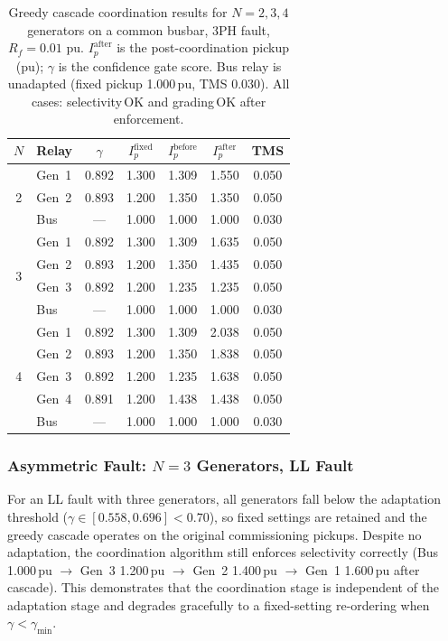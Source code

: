 \documentclass[12pt,a4paper]{article}
\theoremstyle{definition}
\theoremstyle{plain}
\newcommand{\pu}{\,\text{pu}}
\begin{document}
\begin{table}[htbp]
  \centering
  \caption{Greedy cascade coordination results for $N = 2, 3, 4$
           generators on a common busbar, 3PH fault, $R_f = 0.01\,\pu$.
           $I_p^{\mathrm{after}}$ is the post-coordination pickup (pu);
           $\gamma$ is the confidence gate score.
           Bus relay is unadapted (fixed pickup 1.000\,pu, TMS 0.030).
           All cases: selectivity\,OK and grading\,OK after enforcement.}
  \label{tab:multigen:scaling}
  \small
  \begin{tabular}{clccccc}
    \toprule
    $N$ & Relay & $\gamma$ & $I_p^{\mathrm{fixed}}$ & $I_p^{\mathrm{before}}$ &
    $I_p^{\mathrm{after}}$ & TMS \\
    \midrule
    \multirow{3}{*}{2}
      & Gen~1 & 0.892 & 1.300 & 1.309 & 1.550 & 0.050 \\
      & Gen~2 & 0.893 & 1.200 & 1.350 & 1.350 & 0.050 \\
      & Bus   &  ---  & 1.000 & 1.000 & 1.000 & 0.030 \\
    \midrule
    \multirow{4}{*}{3}
      & Gen~1 & 0.892 & 1.300 & 1.309 & 1.635 & 0.050 \\
      & Gen~2 & 0.893 & 1.200 & 1.350 & 1.435 & 0.050 \\
      & Gen~3 & 0.892 & 1.200 & 1.235 & 1.235 & 0.050 \\
      & Bus   &  ---  & 1.000 & 1.000 & 1.000 & 0.030 \\
    \midrule
    \multirow{5}{*}{4}
      & Gen~1 & 0.892 & 1.300 & 1.309 & 2.038 & 0.050 \\
      & Gen~2 & 0.893 & 1.200 & 1.350 & 1.838 & 0.050 \\
      & Gen~3 & 0.892 & 1.200 & 1.235 & 1.638 & 0.050 \\
      & Gen~4 & 0.891 & 1.200 & 1.438 & 1.438 & 0.050 \\
      & Bus   &  ---  & 1.000 & 1.000 & 1.000 & 0.030 \\
    \bottomrule
  \end{tabular}
\end{table}

\subsubsection{Asymmetric Fault: $N=3$ Generators, LL Fault}
\label{sec:results:coord:ll}

For an LL fault with three generators, all generators fall below the
adaptation threshold ($\gamma \in [0.558, 0.696] < 0.70$), so fixed
settings are retained and the greedy cascade operates on the original
commissioning pickups.  Despite no adaptation, the coordination algorithm
still enforces selectivity correctly
(Bus 1.000\,pu $\to$ Gen~3 1.200\,pu $\to$ Gen~2 1.400\,pu
$\to$ Gen~1 1.600\,pu after cascade).
This demonstrates that the coordination stage is independent of the
adaptation stage and degrades gracefully to a fixed-setting re-ordering
when $\gamma < \gamma_{\min}$.
\end{document}
